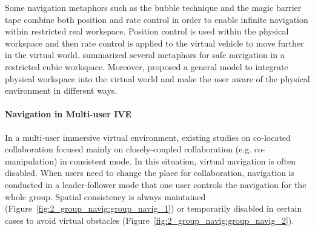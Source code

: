 Some navigation metaphors such as the bubble technique \citep{Dominjon2005Bubble} and the magic barrier tape \citep{Cirio2009MBT} combine both position and rate control in order to enable infinite navigation within restricted real workspace. Position control is used within the physical workspace and then rate control is applied to the virtual vehicle to move further in the virtual world. \citet{Cirio2012Cube} summarized several metaphors for safe navigation in a restricted cubic workspace. Moreover, \citet{Fleury2010Generic} proposed a general model to integrate physical workspace into the virtual world and make the user aware of the physical environment in different ways.

\paragraph{Navigation in Multi-user IVE}
In a multi-user immersive virtual environment, existing studies on co-located collaboration focused mainly on closely-coupled collaboration (e.g. co-manipulation) in consistent mode. In this situation, virtual navigation is often disabled. When users need to change the place for collaboration, navigation is conducted in a leader-follower mode that one user controls the navigation for the whole group. Spatial consistency is always maintained \citep{Beck2013IGG} (Figure~\ref{fig:2_group_navig:group_navig_1}) or temporarily disabled \citep{Kulik2011CSS} in certain cases to avoid virtual obstacles (Figure~\ref{fig:2_group_navig:group_navig_2}).

